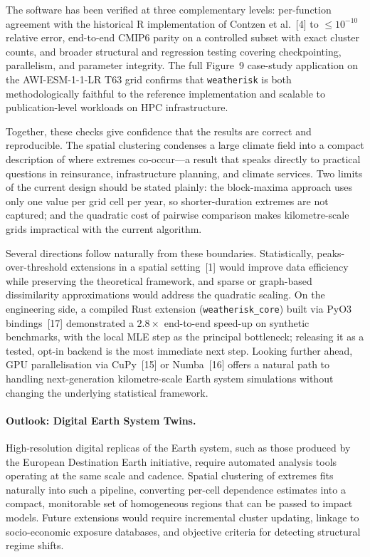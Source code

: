 \documentclass[preprint,12pt,a4paper]{elsarticle}
\newcommand{\revb}[1]{{#1}}
\newcommand{\revg}[1]{{#1}}
\newcommand{\revo}[1]{{#1}}
\begin{document}
\revg{The software has been verified at three complementary levels:
per-function agreement with the historical R implementation of
Contzen et al.~[4] to $\leq 10^{-10}$ relative error,
end-to-end CMIP6 parity on a controlled subset \revb{with exact
cluster counts}, and broader structural and regression testing
covering checkpointing, parallelism, and parameter integrity.
The full Figure~9 \revb{case-study application} on the
AWI-ESM-1-1-LR T63 grid confirms that \texttt{weatherisk} is both
methodologically faithful to the reference implementation and
scalable to publication-level workloads on HPC infrastructure.}

\revg{Together, these checks give confidence that the results are correct and reproducible. The spatial clustering condenses a large
climate field into a compact description of where extremes co-occur---a
result that speaks directly to practical questions in reinsurance,
infrastructure planning, and climate services. Two limits of the current
design should be stated plainly: the block-maxima approach uses only
one value per grid cell per year, so shorter-duration extremes are
not captured; and the quadratic cost of pairwise comparison makes
kilometre-scale grids impractical with the current algorithm.}

\revo{Several directions follow naturally from these boundaries.
Statistically, peaks-over-threshold extensions in a spatial
setting~[1] would improve data efficiency while preserving the
theoretical framework, and sparse or graph-based dissimilarity
approximations would address the quadratic scaling. On the
engineering side, a compiled Rust extension
(\texttt{weatherisk\_core}) built via PyO3 bindings~[17] demonstrated
a $2.8\times$ end-to-end speed-up on synthetic benchmarks, with the
local MLE step as the principal bottleneck; releasing it as a tested,
opt-in backend is the most immediate next step. Looking further
ahead, GPU parallelisation via CuPy~[15] or Numba~[16] offers a
natural path to handling next-generation kilometre-scale Earth system
simulations without changing the underlying statistical framework.}

\revg{\paragraph{Outlook: Digital Earth System Twins.}
High-resolution digital replicas of the Earth system, such as those
produced by the European Destination Earth initiative, require automated
analysis tools operating at the same scale and cadence.
Spatial clustering of extremes fits naturally into such a pipeline,
converting per-cell dependence estimates into a compact, monitorable
set of homogeneous regions that can be passed to impact models.
Future extensions would require incremental cluster updating, linkage
to socio-economic exposure databases, and objective criteria for
detecting structural regime shifts.}
\end{document}
